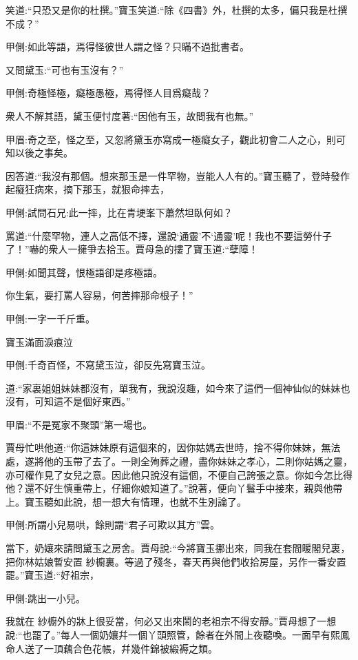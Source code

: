 \begin{parag}
笑道:“只恐又是你的杜撰。”寶玉笑道:“除《四書》外，杜撰的太多，偏只我是杜撰不成？”\begin{note}甲側:如此等語，焉得怪彼世人謂之怪？只瞞不過批書者。\end{note}又問黛玉:“可也有玉沒有？”\begin{note}甲側:奇極怪極，癡極愚極，焉得怪人目爲癡哉？\end{note}衆人不解其語，黛玉便忖度著:“因他有玉，故問我有也無。”\begin{note}甲眉:奇之至，怪之至，又忽將黛玉亦寫成一極癡女子，觀此初會二人之心，則可知以後之事矣。\end{note}因答道:“我沒有那個。想來那玉是一件罕物，豈能人人有的。”寶玉聽了，登時發作起癡狂病來，摘下那玉，就狠命摔去，\begin{note}甲側:試問石兄:此一摔，比在青埂峯下蕭然坦臥何如？\end{note}罵道:“什麼罕物，連人之高低不擇，還說‘通靈’不‘通靈’呢！我也不要這勞什子了！”嚇的衆人一擁爭去拾玉。賈母急的摟了寶玉道:“孽障！\begin{note}甲側:如聞其聲，恨極語卻是疼極語。\end{note}你生氣，要打罵人容易，何苦摔那命根子！”\begin{note}甲側:一字一千斤重。\end{note}寶玉滿面淚痕泣\begin{note}甲側:千奇百怪，不寫黛玉泣，卻反先寫寶玉泣。\end{note}道:“家裏姐姐妹妹都沒有，單我有，我說沒趣，如今來了這們一個神仙似的妹妹也沒有，可知這不是個好東西。”\begin{note}甲眉:“不是冤家不聚頭”第一場也。\end{note}賈母忙哄他道:“你這妹妹原有這個來的，因你姑媽去世時，捨不得你妹妹，無法處，遂將他的玉帶了去了。一則全殉葬之禮，盡你妹妹之孝心，二則你姑媽之靈，亦可權作見了女兒之意。因此他只說沒有這個，不便自己誇張之意。你如今怎比得他？還不好生慎重帶上，仔細你娘知道了。”說著，便向丫鬟手中接來，親與他帶上。寶玉聽如此說，想一想大有情理，也就不生別論了。\begin{note}甲側:所謂小兒易哄，餘則謂“君子可欺以其方”雲。\end{note}
\end{parag}


\begin{parag}
    當下，奶孃來請問黛玉之房舍。賈母說:“今將寶玉挪出來，同我在套間暖閣兒裏，把你林姑娘暫安置  紗櫥裏。等過了殘冬，春天再與他們收拾房屋，另作一番安置罷。”寶玉道:“好祖宗，\begin{note}甲側:跳出一小兒。\end{note}我就在  紗櫥外的牀上很妥當，何必又出來鬧的老祖宗不得安靜。”賈母想了一想說:“也罷了。”每人一個奶孃幷一個丫頭照管，餘者在外間上夜聽喚。一面早有熙鳳命人送了一頂藕合色花帳，幷幾件錦被緞褥之類。
\end{parag}


